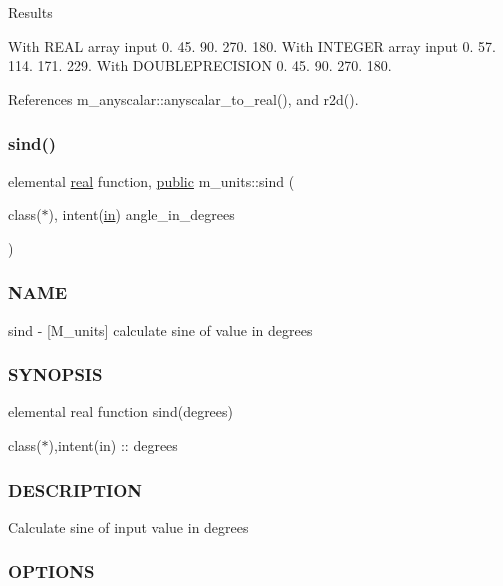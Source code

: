 Results

With R\+E\+AL array input 0. 45. 90. 270. 180. With I\+N\+T\+E\+G\+ER array input 0. 57. 114. 171. 229. With D\+O\+U\+B\+L\+E\+P\+R\+E\+C\+I\+S\+I\+ON 0. 45. 90. 270. 180. 

References m\+\_\+anyscalar\+::anyscalar\+\_\+to\+\_\+real(), and r2d().

\mbox{\label{namespacem__units_afe7f79e1832a71630c0f83602a309aef}} 
\subsubsection{\texorpdfstring{sind()}{sind()}}
{\footnotesize\ttfamily elemental \hyperlink{read__watch_83_8txt_abdb62bde002f38ef75f810d3a905a823}{real} function, \hyperlink{M__stopwatch_83_8txt_a2f74811300c361e53b430611a7d1769f}{public} m\+\_\+units\+::sind (\begin{DoxyParamCaption}\item[{class($\ast$), intent(\hyperlink{M__journal_83_8txt_afce72651d1eed785a2132bee863b2f38}{in})}]{angle\+\_\+in\+\_\+degrees }\end{DoxyParamCaption})}



\subsubsection*{N\+A\+ME}

sind -\/ \mbox{[}M\+\_\+units\mbox{]} calculate sine of value in degrees \subsubsection*{S\+Y\+N\+O\+P\+S\+IS}

elemental real function sind(degrees)

class($\ast$),intent(in) \+:\+: degrees \subsubsection*{D\+E\+S\+C\+R\+I\+P\+T\+I\+ON}

Calculate sine of input value in degrees

\subsubsection*{O\+P\+T\+I\+O\+NS}

